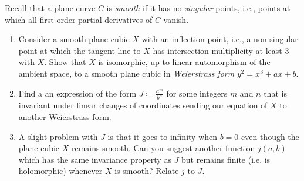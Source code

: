 \documentclass[10pt,letterpaper,cm]{nupset}
\theoremstyle{definition}
\theoremstyle{theorem}
\theoremstyle{remark}
\newcommand{\1}{\mathbb{1}}
\newcommand{\0}{\vec 0}
\newcommand{\be}{\begin{enumerate}}
\newcommand{\ee}{\end{enumerate}}
\begin{document}
\begin{problem}

Recall that a plane curve $C$ is \textit{smooth} if it has no \textit{singular} points, i.e., points at which all first-order partial derivatives of $C$ vanish.
\be
\item Consider	a	smooth	plane	cubic	 $X$	with	an	inflection	point, i.e., a non-singular point at which the tangent line to $X$ has
intersection multiplicity at least $3$ with $X$. Show that $X$	is	isomorphic,	up	to	linear	automorphism	of	the	ambient	space,		to	a
smooth	plane	cubic 	in	\textit{Weierstrass	form} $y^2 = x^3+ax+b$.
\item 	Find	a	an	expression	of	the	form	$J\coloneqq \frac{a^m}{b^n}$	for	some	integers	$m$ and $n$	that	is	invariant	under	linear	changes	of	coordinates 	sending
our	equation	of	$X$	to	another	Weierstrass	form.
\item 	A	slight	 problem	with	$J$	is	that	it	goes 	to	infinity	when	$b=0$	even	 though	the	plane	cubic 	$X$	remains	smooth.	Can	you	suggest
another	function	$j(a,b)$	which	has	the	same	invariance	property as $J$	 but	remains		finite	(i.e.	is	holomorphic)	whenever	$X$	is	smooth?
Relate	$j$	to	$J$.
\ee
\end{problem}
\end{document}
